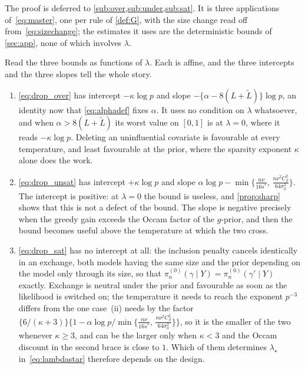 \documentclass[aos]{imsart}
\newcommand{\Ltil}{\widetilde{L}}
\newcommand{\gainfloorsm}{%
    \min\bigl\{\tfrac{n\nu}{16s^{\ast}},\,
    \tfrac{n\nu^{2}C_\beta^{2}}{64\sigma_0^{2}}\bigr\}}
\theoremstyle{plain}
\theoremstyle{definition}
\begin{document}
    The proof is deferred to \cref{sub:over,sub:under,sub:sat}. It is three
    applications of~\eqref{eq:master}, one per rule of \cref{def:G}, with
    the size change read off from~\eqref{eq:sizechange}; the estimates it
    uses are the deterministic bounds of \cref{sec:app}, none of which
    involves $\lambda$.

    Read the three bounds as functions of $\lambda$. Each is affine, and the
    three intercepts and the three slopes tell the whole story.

    \begin{enumerate}[label=(\roman*),leftmargin=2.6em]
        \item \eqref{eq:drop_over} has intercept $-\kappa\log p$ and slope
        $-\{\alpha-8(L+\Ltil)\}\log p$, an identity now that
        \eqref{eq:alphadef} fixes $\alpha$. It uses no condition
        on $\lambda$ whatsoever, and when $\alpha>8(L+\Ltil)$ its worst
        value on $[0,1]$ is at $\lambda=0$, where it reads $-\kappa\log p$.
        Deleting an uninfluential covariate is favourable at every
        temperature, and least favourable at the prior, where the sparsity
        exponent $\kappa$ alone does the work.
        \item \eqref{eq:drop_unsat} has intercept $+\kappa\log p$ and slope
        $\alpha\log p-\gainfloorsm$. The intercept is positive: at
        $\lambda=0$ the bound is useless, and \cref{prop:sharp} shows that
        this is not a defect of the bound. The slope is negative precisely
        when the greedy gain exceeds the Occam factor of the $g$-prior, and
        then the bound becomes useful above the temperature at which the two
        cross.
        \item \eqref{eq:drop_sat} has no intercept at all: the inclusion
        penalty cancels identically in an exchange, both models having the
        same size and the prior depending on the model only through its
        size, so that $\pi_n^{(0)}(\gamma\mid Y)=\pi_n^{(0)}(\gamma'\mid Y)$
        exactly. Exchange is neutral under the prior and favourable as soon
        as the likelihood is switched on; the temperature it needs to reach
        the exponent $p^{-3}$ differs from the one case~(ii) needs by the
        factor $\{6/(\kappa+3)\}\{1-\alpha\log p/\gainfloorsm\}$, so it
        is the smaller of the two whenever $\kappa\geq3$, and can be the
        larger only when $\kappa<3$ and the Occam discount in the second
        brace is close to $1$. Which of them determines $\lambda_\star$
        in~\eqref{eq:lambdastar} therefore depends on the design.
    \end{enumerate}
\end{document}
